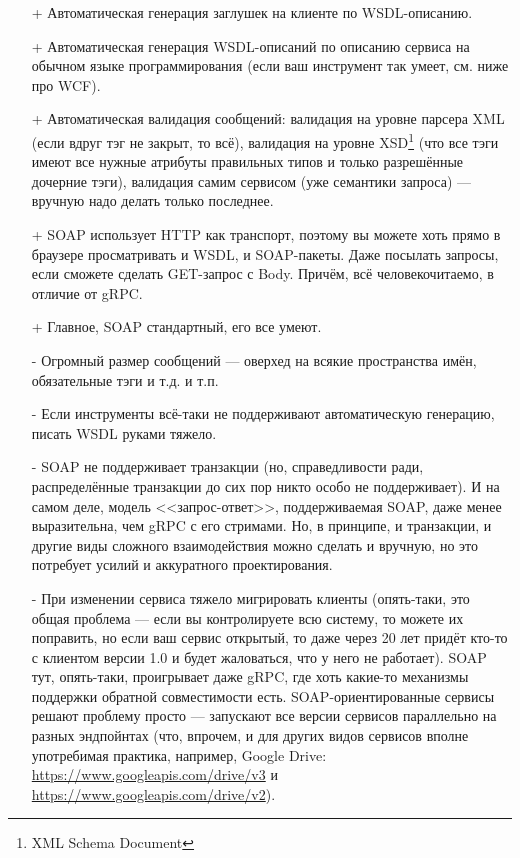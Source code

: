 \documentclass{../../text-style}
\begin{document}
\begin{itemize}
    \item[+] Автоматическая генерация заглушек на клиенте по WSDL-описанию.
    \item[+] Автоматическая генерация WSDL-описаний по описанию сервиса на обычном языке программирования (если ваш инструмент так умеет, см. ниже про WCF).
    \item[+] Автоматическая валидация сообщений: валидация на уровне парсера XML (если вдруг тэг не закрыт, то всё), валидация на уровне XSD\footnote{XML Schema Document} (что все тэги имеют все нужные атрибуты правильных типов и только разрешённые дочерние тэги), валидация самим сервисом (уже семантики запроса) --- вручную надо делать только последнее.
    \item[+] SOAP использует HTTP как транспорт, поэтому вы можете хоть прямо в браузере просматривать и WSDL, и SOAP-пакеты. Даже посылать запросы, если сможете сделать GET-запрос с Body. Причём, всё человекочитаемо, в отличие от gRPC.
    \item[+] Главное, SOAP стандартный, его все умеют.
    \item[-] Огромный размер сообщений --- оверхед  на всякие пространства имён, обязательные тэги и т.д. и т.п.
    \item[-] Если инструменты всё-таки не поддерживают автоматическую генерацию, писать WSDL руками тяжело.
    \item[-] SOAP не поддерживает транзакции (но, справедливости ради, распределённые транзакции до сих пор никто особо не поддерживает). И на самом деле, модель <<запрос-ответ>>, поддерживаемая SOAP, даже менее выразительна, чем gRPC с его стримами. Но, в принципе, и транзакции, и другие виды сложного взаимодействия можно сделать и вручную, но это потребует усилий и аккуратного проектирования.
    \item[-] При изменении сервиса тяжело мигрировать клиенты (опять-таки, это общая проблема --- если вы контролируете всю систему, то можете их поправить, но если ваш сервис открытый, то даже через 20 лет придёт кто-то с клиентом версии 1.0 и будет жаловаться, что у него не работает). SOAP тут, опять-таки, проигрывает даже gRPC, где хоть какие-то механизмы поддержки обратной совместимости есть. SOAP-ориентированные сервисы решают проблему просто --- запускают все версии сервисов параллельно на разных эндпойнтах (что, впрочем, и для других видов сервисов вполне употребимая практика, например, Google Drive: \url{https://www.googleapis.com/drive/v3} и \url{https://www.googleapis.com/drive/v2}).
\end{itemize}
\end{document}
